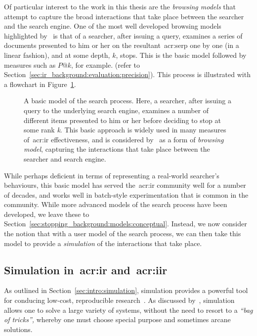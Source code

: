 Of particular interest to the work in this thesis are the \emph{browsing models} that attempt to capture the broad interactions that take place between the searcher and the search engine. One of the most well developed browsing models highlighted by~\cite{carterette2011models} is that of a searcher, after issuing a query, examines a series of documents presented to him or her on the resultant~\gls{acr:serp} one by one (in a linear fashion), and at some depth, $k$, stops. This is the basic model followed by measures such as $P@k$, for example. (refer to Section~\ref{sec:ir_background:evaluation:precision}). This process is illustrated with a flowchart in Figure~\ref{fig:basic_model}.

\begin{figure}[t!]
    \centering
    \caption[A basic user model of search]{A basic model of the search process. Here, a searcher, after issuing a query to the underlying search engine, examines a number of different items presented to him or her before deciding to stop at some rank \emph{k}. This basic approach is widely used in many measures of~\gls{acr:ir} effectiveness, and is considered by~\cite{carterette2011models} as a form of \emph{browsing model}, capturing the interactions that take place between the searcher and search engine.}
    \label{fig:basic_model}
\end{figure}

While perhaps deficient in terms of representing a real-world searcher's behaviours, this basic model has served the~\gls{acr:ir} community well for a number of decades, and works well in batch-style experimentation that is common in the community. While more advanced models of the search process have been developed, we leave these to Section~\ref{sec:stopping_background:models:conceptual}. Instead, we now consider the notion that with a user model of the search process, we can then take this model to provide a \emph{simulation} of the interactions that take place.

\subsection{Simulation in~\gls{acr:ir} and~\gls{acr:iir}}\label{sec:ir_background:user:simulation}
As outlined in Section~\ref{sec:intro:simulation}, simulation provides a powerful tool for conducing low-cost, reproducible research~\citep{azzopardi2010workshop}. As discussed by~\cite{fishwick1995simulation}, simulation allows one to solve a large variety of systems, without the need to resort to a \emph{``bag of tricks'',} whereby one must choose special purpose and sometimes arcane solutions.

